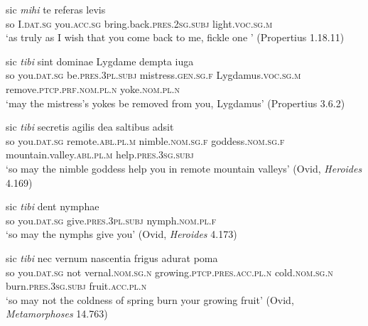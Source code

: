 \begin{exe}
\ex
\gll sic \emph{mihi} te referas levis\\
so I.\textsc{dat.sg} you.\textsc{acc.sg} bring.back.\textsc{pres.2sg.subj} light.\textsc{voc.sg.m}\\
\trans `as truly as I wish that you come back to me, fickle one ’ (Propertius 1.18.11)
\label{assertionFormulae18}
\end{exe}%

\begin{exe}
\ex
\gll sic \emph{tibi} sint dominae Lygdame dempta iuga\\
so you.\textsc{dat.sg} be.\textsc{pres.3pl.subj} mistress.\textsc{gen.sg.f} Lygdamus.\textsc{voc.sg.m} remove.\textsc{ptcp.prf.nom.pl.n} yoke.\textsc{nom.pl.n}\\
\trans `may the mistress's yokes be removed from you, Lygdamus’ (Propertius 3.6.2)
\label{assertionFormulae19}
\end{exe}%

\begin{exe}
\ex
\gll sic \emph{tibi} secretis agilis dea saltibus adsit\\
so you.\textsc{dat.sg} remote.\textsc{abl.pl.m} nimble.\textsc{nom.sg.f} goddess.\textsc{nom.sg.f} mountain.valley.\textsc{abl.pl.m} help.\textsc{pres.3sg.subj}\\
\trans `so may the nimble goddess help you in remote mountain valleys’ (Ovid, \textit{Heroides} 4.169)
\label{assertionFormulae20}
\end{exe}

\begin{exe}
\ex
\gll sic \emph{tibi} dent nymphae\\
so you.\textsc{dat.sg} give.\textsc{pres.3pl.subj} nymph.\textsc{nom.pl.f}\\
\trans `so may the nymphs give you’ (Ovid, \textit{Heroides} 4.173)
\label{assertionFormulae21}
\end{exe}

\begin{exe}
\ex
\gll sic \emph{tibi} nec vernum nascentia frigus adurat poma\\
so you.\textsc{dat.sg} not vernal.\textsc{nom.sg.n} growing.\textsc{ptcp.pres.acc.pl.n} cold.\textsc{nom.sg.n} burn.\textsc{pres.3sg.subj} fruit.\textsc{acc.pl.n}\\
\trans `so may not the coldness of spring burn your growing fruit’ (Ovid, \textit{Metamorphoses} 14.763)
\label{assertionFormulae22}
\end{exe}

